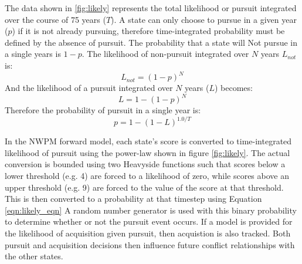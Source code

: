 The data shown in \ref{fig:likely} represents the total likelihood or pursuit integrated over the course of 75 years ($T$). A state can only choose to pursue in a given year ($p$) if it is not already pursuing, therefore time-integrated probability must be defined by the absence of pursuit. The probability that a state will Not pursue in a single years is $1 - p$. The likelihood of non-pursuit integrated over $N$ years $L_{not}$ is:
\begin{equation}
L_{not} = (1- p)^{N}
\end{equation}
And the likelihood of a pursuit integrated over $N$ years ($L$) becomes:
\begin{equation}
L = 1 - (1-p)^{N}
  \end{equation}
Therefore the probability of pursuit in a single year is:
\begin{equation}
p = 1 - (1 - L)^{1.0/T}
\label{eqn:likely_eqn}
\end{equation}

In the \gls{NWPM} forward model, each state's score is converted to time-integrated likelihood of pursuit using the power-law shown in figure \ref{fig:likely}. The actual conversion is bounded using two Heavyside functions such that scores below a lower threshold (e.g. 4) are forced to a likelihood of zero, while scores above an upper threshold (e.g. 9) are forced to the value of the score at that threshold. This is then converted to a probability at that timestep using Equation \ref{eqn:likely_eqn}   A random number generator is used with this binary probability to determine whether or not the pursuit event occurs. If a model is provided for the likelihood of acquisition given pursuit, then acquistion is also tracked. Both pursuit and acquisition decisions then influence future conflict relationships with the other states.


